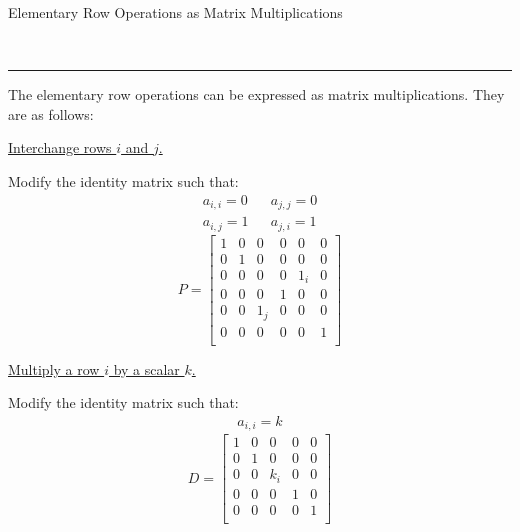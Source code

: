 \documentclass{article}
\newcommand{\header}[1]{\begin{large}\noindent #1\end{large}\\\rule{\textwidth}{0.5pt}}
\newcommand{\centertext}[1]{\begin{center}#1\end{center}}
\begin{document}
    \header{Elementary Row Operations as Matrix Multiplications}

    The elementary row operations can be expressed as matrix multiplications. They
    are as follows:

    \begin{multicols}{3}
        \noindent
        \centertext{\underline{Interchange rows $i$ and $j$.}}
        Modify the identity matrix such that:
        \begin{align*}
            a_{i, i} = 0 && a_{j, j} = 0\\ a_{i, j} = 1 && a_{j, i} = 1
        \end{align*}
        \[
            P = \begin{bmatrix}
                1 & 0 & 0 & 0 & 0 & 0\\
                0 & 1 & 0 & 0 & 0 & 0\\
                0 & 0 & 0 & 0 & 1_i & 0\\
                0 & 0 & 0 & 1 & 0 & 0\\
                0 & 0 & 1_j & 0 & 0 & 0\\
                0 & 0 & 0 & 0 & 0 & 1\\
            \end{bmatrix}  
        \]        
        \vfill\null\columnbreak
        
        \centertext{\underline{Multiply a row $i$ by a scalar $k$.}}
        Modify the identity matrix such that:
        \begin{align*}
            a_{i, i} = k
        \end{align*}
        \[
            D = \begin{bmatrix}
                1 & 0 & 0 & 0 & 0\\
                0 & 1 & 0 & 0 & 0\\
                0 & 0 & k_i & 0 & 0\\
                0 & 0 & 0 & 1 & 0\\
                0 & 0 & 0 & 0 & 1\\
            \end{bmatrix}
        \]
        \vfill\null\columnbreak


\end{multicols}
\end{document}
